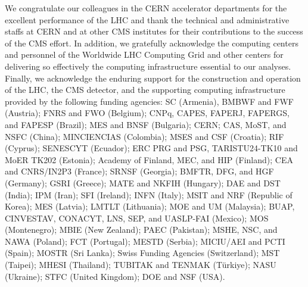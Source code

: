 \begin{acknowledgments}
We congratulate our colleagues in the CERN accelerator departments for the excellent performance of the LHC and thank the technical and administrative staffs at CERN and at other CMS institutes for their contributions to the success of the CMS effort. In addition, we gratefully acknowledge the computing centers and personnel of the Worldwide LHC Computing Grid and other centers for delivering so effectively the computing infrastructure essential to our analyses. Finally, we acknowledge the enduring support for the construction and operation of the LHC, the CMS detector, and the supporting computing infrastructure provided by the following funding agencies: SC (Armenia), BMBWF and FWF (Austria); FNRS and FWO (Belgium); CNPq, CAPES, FAPERJ, FAPERGS, and FAPESP (Brazil); MES and BNSF (Bulgaria); CERN; CAS, MoST, and NSFC (China); MINCIENCIAS (Colombia); MSES and CSF (Croatia); RIF (Cyprus); SENESCYT (Ecuador); ERC PRG and PSG, TARISTU24-TK10 and MoER TK202 (Estonia); Academy of Finland, MEC, and HIP (Finland); CEA and CNRS/IN2P3 (France); SRNSF (Georgia); BMFTR, DFG, and HGF (Germany); GSRI (Greece); MATE and NKFIH (Hungary); DAE and DST (India); IPM (Iran); SFI (Ireland); INFN (Italy); MSIT and NRF (Republic of Korea); MES (Latvia); LMTLT (Lithuania); MOE and UM (Malaysia); BUAP, CINVESTAV, CONACYT, LNS, SEP, and UASLP-FAI (Mexico); MOS (Montenegro); MBIE (New Zealand); PAEC (Pakistan); MSHE, NSC, and NAWA (Poland); FCT (Portugal); MESTD (Serbia); MICIU/AEI and PCTI (Spain); MOSTR (Sri Lanka); Swiss Funding Agencies (Switzerland); MST (Taipei); MHESI (Thailand); TUBITAK and TENMAK (T\"{u}rkiye); NASU (Ukraine); STFC (United Kingdom); DOE and NSF (USA).



\end{acknowledgments}
